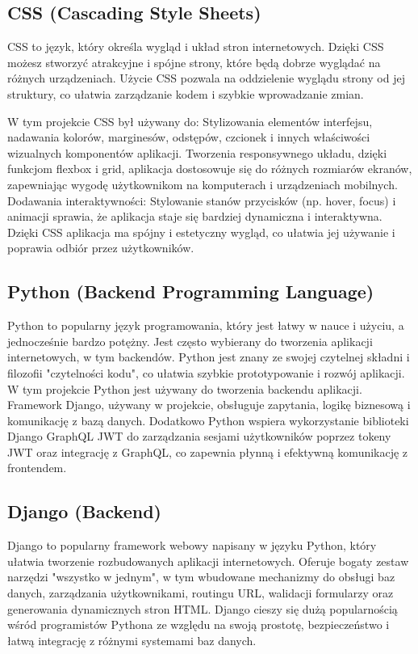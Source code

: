 \documentclass[wmii,inf,inz]{uwmthesis} %
\begin{document}
\subsection{CSS (Cascading Style Sheets)}
CSS to język, który określa wygląd i układ stron internetowych. Dzięki CSS możesz stworzyć atrakcyjne i spójne strony, które będą dobrze wyglądać na różnych urządzeniach. Użycie CSS pozwala na oddzielenie wyglądu strony od jej struktury, co ułatwia zarządzanie kodem i szybkie wprowadzanie zmian.

W tym projekcie CSS był używany do:
Stylizowania elementów interfejsu, nadawania kolorów, marginesów, odstępów, czcionek i innych właściwości wizualnych komponentów aplikacji.
Tworzenia responsywnego układu, dzięki funkcjom flexbox i grid, aplikacja dostosowuje się do różnych rozmiarów ekranów, zapewniając wygodę użytkownikom na komputerach i urządzeniach mobilnych.
Dodawania interaktywności: Stylowanie stanów przycisków (np. hover, focus) i animacji sprawia, że aplikacja staje się bardziej dynamiczna i interaktywna.
Dzięki CSS aplikacja ma spójny i estetyczny wygląd, co ułatwia jej używanie i poprawia odbiór przez użytkowników.
\subsection{Python (Backend Programming Language)}
Python to popularny język programowania, który jest łatwy w nauce i użyciu, a jednocześnie bardzo potężny. Jest często wybierany do tworzenia aplikacji internetowych, w tym backendów. Python jest znany ze swojej czytelnej składni i filozofii "czytelności kodu", co ułatwia szybkie prototypowanie i rozwój aplikacji.
W tym projekcie Python jest używany do tworzenia backendu aplikacji. Framework Django, używany w projekcie, obsługuje zapytania, logikę biznesową i komunikację z bazą danych. Dodatkowo Python wspiera wykorzystanie biblioteki Django GraphQL JWT do zarządzania sesjami użytkowników poprzez tokeny JWT oraz integrację z GraphQL, co zapewnia płynną i efektywną komunikację z frontendem.
\subsection{Django (Backend)}
Django to popularny framework webowy napisany w języku Python, który ułatwia tworzenie rozbudowanych aplikacji internetowych. Oferuje bogaty zestaw narzędzi "wszystko w jednym", w tym wbudowane mechanizmy do obsługi baz danych, zarządzania użytkownikami, routingu URL, walidacji formularzy oraz generowania dynamicznych stron HTML. Django cieszy się dużą popularnością wśród programistów Pythona ze względu na swoją prostotę, bezpieczeństwo i łatwą integrację z różnymi systemami baz danych.
\end{document}
